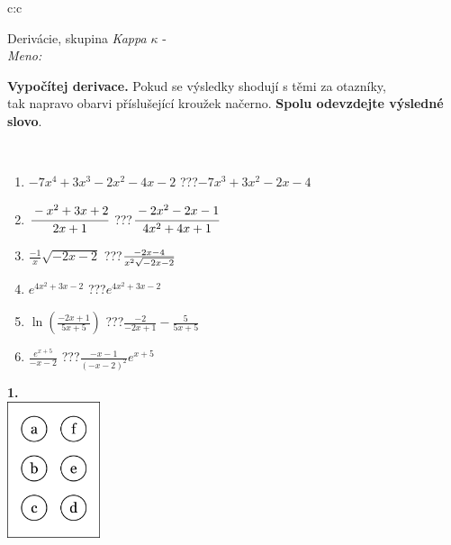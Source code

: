 \documentclass[10pt]{report}
\begin{document}
\begin{tabular}{c:c}
\begin{minipage}[c][104.5mm][t]{0.5\linewidth}
\begin{center}
\vspace{7mm}
{\huge Derivácie, skupina \textit{Kappa $\kappa$} -}\\[5mm]
\textit{Meno:}\phantom{xxxxxxxxxxxxxxxxxxxxxxxxxxxxxxxxxxxxxxxxxxxxxxxxxxxxxxxxxxxxxxxxx}\\[5mm]
\begin{minipage}{0.95\linewidth}
\begin{center}
\textbf{Vypočítej derivace.} Pokud se výsledky shodují s těmi za otazníky,\\tak napravo obarvi příslušející kroužek načerno. \textbf{Spolu odevzdejte výsledné slovo}.
\end{center}
\end{minipage}
\\[1mm]
\begin{minipage}{0.79\linewidth}
\begin{center}
\begin{varwidth}{\linewidth}
\begin{enumerate}
\normalsize
\item $-7x^4+3x^3-2x^2-4x-2$\quad \dotfill\; ???\;\dotfill \quad $-7x^3+3x^2-2x-4$
\item $\cfrac{-x^2+3x+2}{2x+1}$\quad \dotfill\; ???\;\dotfill \quad $\cfrac{-2x^2-2x-1}{4x^2+4x+1}$
\item $\frac{-1}{x}\sqrt{-2x-2}$\quad \dotfill\; ???\;\dotfill \quad $\frac{-2x-4}{x^2 \sqrt{\smash[b]{-2x-2}}}$
\item $e^{4x^2+3x-2}$\quad \dotfill\; ???\;\dotfill \quad $e^{4x^2+3x-2}$
\item $\ln{\left(\frac{-2x+1}{5x+5}\right)}$\quad \dotfill\; ???\;\dotfill \quad $\frac{-2}{-2x+1}-\frac{5}{5x+5}$
\item $\frac{e^{x+5}}{-x-2}$\quad \dotfill\; ???\;\dotfill \quad $\frac{-x-1}{(-x-2)^2}e^{x+5}$
\end{enumerate}
\end{varwidth}
\end{center}
\end{minipage}
\begin{minipage}{0.20\linewidth}
\begin{center}
{\Huge\bfseries 1.} \\[2mm]
\includegraphics[height=40mm]{../images/braille.png}

\end{center}
\end{minipage}
\end{center}
\end{minipage}
\end{tabular}
\end{document}
